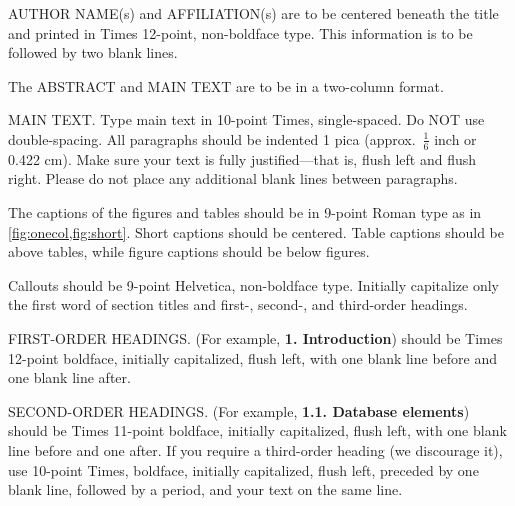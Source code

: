 AUTHOR NAME(s) and AFFILIATION(s) are to be centered beneath the title
and printed in Times 12-point, non-boldface type.
This information is to be followed by two blank lines.

The ABSTRACT and MAIN TEXT are to be in a two-column format.

MAIN TEXT.
Type main text in 10-point Times, single-spaced.
Do NOT use double-spacing.
All paragraphs should be indented 1 pica (approx.~$\frac{1}{6}$ inch or 0.422 cm).
Make sure your text is fully justified---that is, flush left and flush right.
Please do not place any additional blank lines between paragraphs.

The captions of the figures and tables should be in 9-point Roman type as in \cref{fig:onecol,fig:short}.
Short captions should be centered.  Table captions should be above tables, while figure captions should be below figures.

\noindent Callouts should be 9-point Helvetica, non-boldface type.
Initially capitalize only the first word of section titles and first-, second-, and third-order headings.

FIRST-ORDER HEADINGS.
(For example, {\large \bf 1. Introduction}) should be Times 12-point boldface, initially capitalized, flush left, with one blank line before and one blank line after.

SECOND-ORDER HEADINGS.
(For example, { \bf 1.1. Database elements}) should be Times 11-point boldface, initially capitalized, flush left, with one blank line before and one after.
If you require a third-order heading (we discourage it), use 10-point Times, boldface, initially capitalized, flush left, preceded by one blank line, followed by a period, and your text on the same line.




